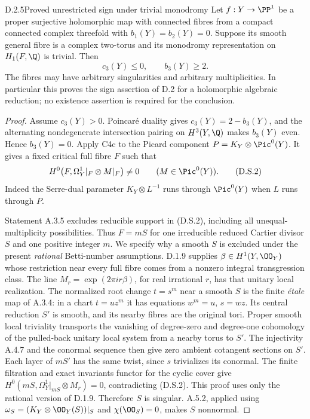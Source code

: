 \begin{idstatement}{D.2.5}{Proved unrestricted sign under trivial monodromy}
\label{st:D.2.5}
Let $f:Y\to\PP^1$ be a proper surjective holomorphic map with
connected fibres from a compact connected complex threefold with
$b_1(Y)=b_2(Y)=0$. Suppose its smooth general fibre is a complex
two-torus and its monodromy representation on $H_1(F,\Q)$ is
trivial. Then
\[
 c_3(Y)\le0,\qquad b_3(Y)\ge2.
 \tag{D.S.1}
\]
The fibres may have arbitrary singularities and arbitrary
multiplicities. In particular this proves the sign assertion of
D.2 for a holomorphic algebraic reduction; no existence assertion
is required for the conclusion.
\end{idstatement}
\begin{proof}
Assume $c_3(Y)>0$. Poincar\'e duality gives
$c_3(Y)=2-b_3(Y)$, and the alternating nondegenerate intersection
pairing on $H^3(Y,\Q)$ makes $b_3(Y)$ even. Hence $b_3(Y)=0$.
Apply C4c to the Picard component
$P=K_Y\otimes\Pic^0(Y)$. It gives a fixed critical full fibre
$F$ such that
\[
 H^0\bigl(F,\Omega_Y^1|_F\otimes M|_F\bigr)\ne0
 \qquad(M\in\Pic^0(Y)).
 \tag{D.S.2}
\]
Indeed the Serre-dual parameter $K_Y\otimes L^{-1}$ runs through
$\Pic^0(Y)$ when $L$ runs through $P$.

Statement A.3.5 excludes reducible support in (D.S.2), including
all unequal-multiplicity possibilities. Thus $F=mS$ for one
irreducible reduced Cartier divisor $S$ and one positive integer
$m$. We specify why a smooth $S$ is excluded under the present
\emph{rational} Betti-number assumptions. D.1.9 supplies
$\beta\in H^1(Y,\OO_Y)$ whose restriction near every full fibre
comes from a nonzero integral transgression class. The line
$M_r=\exp(2\pi i r\beta)$, for real irrational $r$, has that
unitary local realization. The normalized root change $t=s^m$
near a smooth $S$ is the finite \emph{\'etale} map of A.3.4:
in a chart $t=uz^m$ it has equations $w^m=u$, $s=wz$.
Its central reduction $S'$ is smooth, and its nearby fibres are
the original tori. Proper smooth local triviality transports
the vanishing of degree-zero and degree-one cohomology of the
pulled-back unitary local system from a nearby torus to $S'$.
The injectivity A.4.7 and the conormal sequence then give zero
ambient cotangent sections on $S'$. Each layer of $mS'$ has the
same twist, since $s$ trivializes its conormal. The finite
filtration and exact invariants functor for the cyclic cover
give $H^0(mS,\Omega_Y^1|_{mS}\otimes M_r)=0$, contradicting
(D.S.2). This proof uses only the rational version of D.1.9.
Therefore $S$ is singular. A.5.2, applied using
$\omega_S=(K_Y\otimes\OO_Y(S))|_S$ and
$\chi(\OO_S)=0$, makes $S$ nonnormal.


\end{proof}
